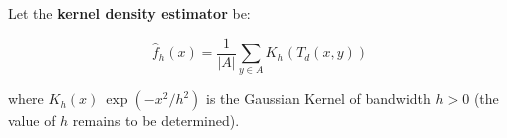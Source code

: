 Let the \textbf{ kernel density estimator} be:

\[   \hat{f}_h(x) = \frac{1}{|A|}\sum_{ y \in A} K_h (T_d(x,y))  \]

 where $K_h(x) \ \exp( -x^2/h^2)$ is the Gaussian Kernel of bandwidth $h>0$ (the value of $h$ remains to be determined).



